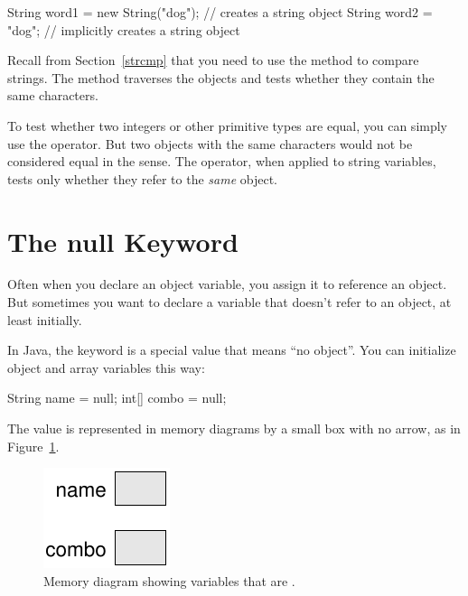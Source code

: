 \begin{code}
String word1 = new String("dog");  // creates a string object
String word2 = "dog";   // implicitly creates a string object
\end{code}


Recall from Section~\ref{strcmp} that you need to use the  method to compare strings.
The  method traverses the  objects and tests whether they contain the same characters.

To test whether two integers or other primitive types are equal, you can simply use the \java{==} operator.
But two  objects with the same characters would not be considered equal in the \java{==} sense.
The \java{==} operator, when applied to string variables, tests only whether they refer to the {\em same} object.


\section{The null Keyword}

Often when you declare an object variable, you assign it to reference an object.
But sometimes you want to declare a variable that doesn't refer to an object, at least initially.


In Java, the keyword  is a special value that means ``no object''.
You can initialize object and array variables this way:

\begin{code}
String name = null;
int[] combo = null;
\end{code}

The value  is represented in memory diagrams by a small box with no arrow, as in Figure~\ref{fig.mem4}.

\begin{figure}[!ht]
\begin{center}
\includegraphics{figs/mem4.pdf}
\caption{Memory diagram showing variables that are .}
\label{fig.mem4}
\end{center}
\end{figure}

